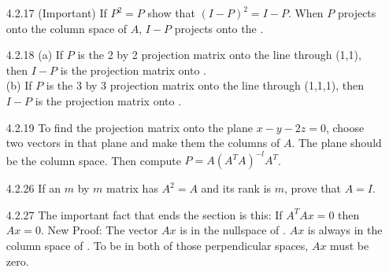 \documentclass[10pt,twoside,reqno]{article}
\begin{document}
\begin{enumerate}
\vspace{3mm}
\item[4.2.17] (Important) If $P^2 = P$ show that $(I - P)^2 = I - P$. When $P$ projects onto the column space of $A$, $I- P$ projects onto the \underline{\hspace{8mm}}. \\
\vspace{3mm}

\vspace{3mm}
\item[4.2.18] (a) If $P$ is the 2 by 2 projection matrix onto the line through (1,1), then $I - P$ is the projection matrix onto \underline{\hspace{8mm}}. \\
 (b) If $P$ is the 3 by 3 projection matrix onto the line through (1,1,1), then $I - P$ is the projection matrix onto \underline{\hspace{8mm}}. \\
\vspace{3mm}

\vspace{3mm}
\item[4.2.19] To find the projection matrix onto the plane $x - y - 2z = 0$, choose two vectors in that plane and make them the columns of $A$. The plane should be the column space. Then compute $P = A(A^T A)^{-l} A^T$. \\
\vspace{3mm}

\vspace{3mm}
\item[4.2.26] If an $m$ by $m$ matrix has $A^2 = A$ and its rank is $m$, prove that $A = I$. \\
\vspace{3mm}

\vspace{3mm}
\item[4.2.27] The important fact that ends the section is this: If $A^TAx = 0$ then $Ax = 0$. New Proof: The vector $Ax$ is in the nullspace of \underline{\hspace{8mm}}. $Ax$ is always in the column space of \underline{\hspace{8mm}}. To be in both of those perpendicular spaces, $Ax$ must be zero. \\
\vspace{3mm}


\end{enumerate}
\end{document}

